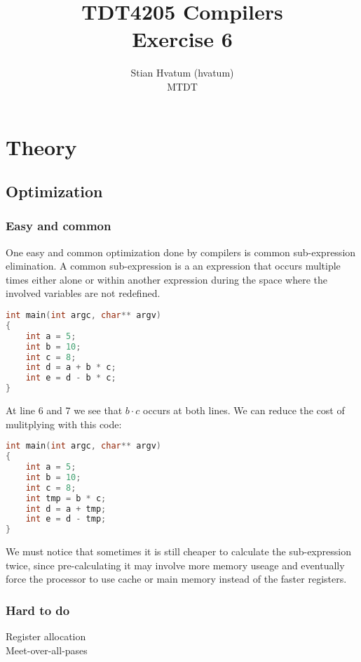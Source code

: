 \documentclass[english,a4paper]{scrartcl}
\title{TDT4205 Compilers\\
\Huge Exercise 6}
\author{Stian Hvatum (hvatum)\\MTDT}
\begin{document}
\maketitle
\tableofcontents
\newpage
\section{Theory}
\subsection{Optimization}
\subsubsection{Easy and common}
One easy and common optimization done by compilers is common sub-expression
elimination. A common sub-expression is a an expression that occurs multiple
times either alone or within another expression during the space where the
involved variables are not redefined.

\begin{lstlisting}[language=C]
int main(int argc, char** argv)
{
    int a = 5;
    int b = 10;
    int c = 8;
    int d = a + b * c;
    int e = d - b * c;
}
\end{lstlisting}

At line 6 and 7 we see that \(b \cdot c\) occurs at both lines. We can reduce
the cost of mulitplying with this code:
\begin{lstlisting}[language=C]
int main(int argc, char** argv)
{
    int a = 5;
    int b = 10;
    int c = 8;
    int tmp = b * c;
    int d = a + tmp;
    int e = d - tmp;
}
\end{lstlisting}

We must notice that sometimes it is still cheaper to calculate the
sub-expression twice, since pre-calculating it may involve more memory useage
and eventually force the processor to use cache or main memory instead of
the faster registers.

\subsubsection{Hard to do}
Register allocation\\Meet-over-all-pases
\end{document}

